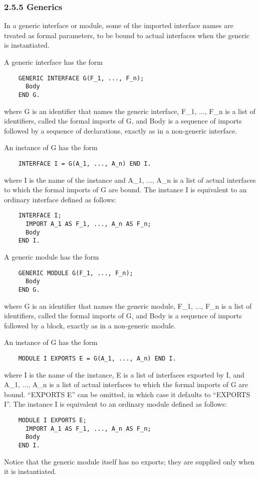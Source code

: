 \documentclass[10pt]{article}
\begin{document}
\subsubsection*{2.5.5 Generics}

In a generic interface or module, some of the imported interface names are
treated as formal parameters, to be bound to actual interfaces when the
generic is instantiated.

A generic interface has the form
\begin{verbatim}
    GENERIC INTERFACE G(F_1, ..., F_n);
      Body
    END G.
\end{verbatim}
where G is an identifier that names the generic interface, F\_1, ..., F\_n is
a list of identifiers, called the formal imports of G, and Body is a sequence
of imports followed by a sequence of declarations, exactly as in a non-generic
interface.

An instance of G has the form
\begin{verbatim}
    INTERFACE I = G(A_1, ..., A_n) END I.
\end{verbatim}
where I is the name of the instance and A\_1, ..., A\_n is a list of actual
interfaces to which the formal imports of G are bound. The instance I is
equivalent to an ordinary interface defined as follows:
\begin{verbatim}
    INTERFACE I;
      IMPORT A_1 AS F_1, ..., A_n AS F_n;
      Body
    END I.
\end{verbatim}

A generic module has the form
\begin{verbatim}
    GENERIC MODULE G(F_1, ..., F_n);
      Body
    END G.
\end{verbatim}
where G is an identifier that names the generic module, F\_1, ..., F\_n is a
list of identifiers, called the formal imports of G, and Body is a sequence of
imports followed by a block, exactly as in a non-generic module.

An instance of G has the form
\begin{verbatim}
    MODULE I EXPORTS E = G(A_1, ..., A_n) END I.
\end{verbatim}
where I is the name of the instance, E is a list of interfaces exported by I,
and A\_1, ..., A\_n is a list of actual interfaces to which the formal imports
of G are bound. ``EXPORTS E'' can be omitted, in which case it defaults to
``EXPORTS I''. The instance I is equivalent to an ordinary module defined as
follows:
\begin{verbatim}
    MODULE I EXPORTS E;
      IMPORT A_1 AS F_1, ..., A_n AS F_n;
      Body
    END I.
\end{verbatim}
Notice that the generic module itself has no exports; they are supplied only
when it is instantiated.
\end{document}
